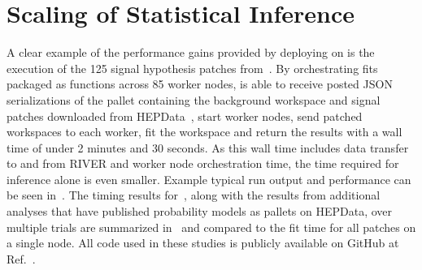 \section{Scaling of Statistical Inference}\label{sec:results}
%
A clear example of the performance gains provided by deploying \pyhf{} on \funcX{} is the execution of the 125 signal hypothesis patches from~\cite{SUSY-2019-08}.
By orchestrating \pyhf{} fits packaged as \funcX{} functions across 85 worker nodes, \funcX{} is able to receive posted JSON serializations of the \pyhf{} pallet containing the background workspace and signal patches downloaded from HEPData~\cite{ATLAS_SUSY_1Lbb_pallet}, start \funcX{} worker nodes, send patched workspaces to each worker, fit the workspace and return the results with a wall time of under 2 minutes and 30 seconds.
As this wall time includes data transfer to and from RIVER and worker node orchestration time, the time required for inference alone is even smaller.
Example typical run output and performance can be seen in~.
The timing results for~\cite{ATLAS_SUSY_1Lbb_pallet}, along with the results from additional analyses that have published probability models as \pyhf{} pallets on HEPData, over multiple trials are summarized in~ and compared to the fit time for all patches on a single node.
All code used in these studies is publicly available on GitHub at Ref.~\cite{study_code}.


